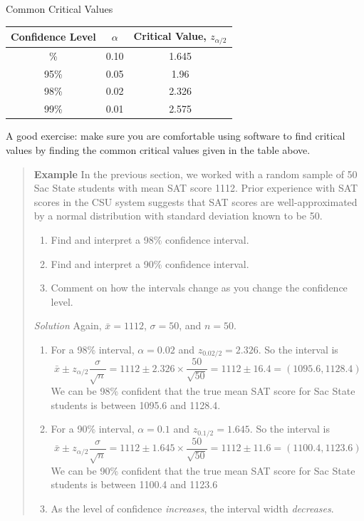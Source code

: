 \documentclass[
]{book}
\providecommand{\tightlist}{%
  \setlength{\itemsep}{0pt}\setlength{\parskip}{0pt}}
\begin{document}
Common Critical Values

\begin{longtable}[]{@{}ccc@{}}
\toprule\noalign{}
Confidence Level & \(\alpha\) & Critical Value, \(z_{\alpha/2}\) \\
\midrule\noalign{}
\endhead
\bottomrule\noalign{}
\endlastfoot
90\% & 0.10 & 1.645 \\
95\% & 0.05 & 1.96 \\
98\% & 0.02 & 2.326 \\
99\% & 0.01 & 2.575 \\
\end{longtable}

A good exercise: make sure you are comfortable using software to find critical values by finding the common critical values given in the table above.

\begin{quote}
\textbf{Example} In the previous section, we worked with a random sample of 50 Sac State students with mean SAT score 1112. Prior experience with SAT scores in the CSU system suggests that SAT scores are well-approximated by a normal distribution with standard deviation known to be 50.

\begin{enumerate}
\def\labelenumi{\alph{enumi}.}
\tightlist
\item
  Find and interpret a 98\% confidence interval.
\item
  Find and interpret a 90\% confidence interval.
\item
  Comment on how the intervals change as you change the confidence level.
\end{enumerate}

\emph{Solution} Again, \(\bar{x} = 1112\), \(\sigma=50\), and \(n=50\).

\begin{enumerate}
\def\labelenumi{\alph{enumi}.}
\tightlist
\item
  For a 98\% interval, \(\alpha=0.02\) and \(z_{0.02/2} = 2.326\). So the interval is \[
  \bar{x} \pm z_{\alpha/2}\frac{\sigma}{\sqrt{n}} = 1112 \pm 2.326\times\frac{50}{\sqrt{50}} = 1112 \pm 16.4 = (1095.6, 1128.4)
  \]
  We can be 98\% confident that the true mean SAT score for Sac State students is between 1095.6 and 1128.4.
\item
  For a 90\% interval, \(\alpha=0.1\) and \(z_{0.1/2} = 1.645\). So the interval is \[
  \bar{x} \pm z_{\alpha/2}\frac{\sigma}{\sqrt{n}} = 1112 \pm 1.645\times\frac{50}{\sqrt{50}} = 1112 \pm 11.6 = (1100.4, 1123.6)
  \]
  We can be 90\% confident that the true mean SAT score for Sac State students is between 1100.4 and 1123.6
\item
  As the level of confidence \emph{increases}, the interval width \emph{decreases}.
\end{enumerate}
\end{quote}
\end{document}

